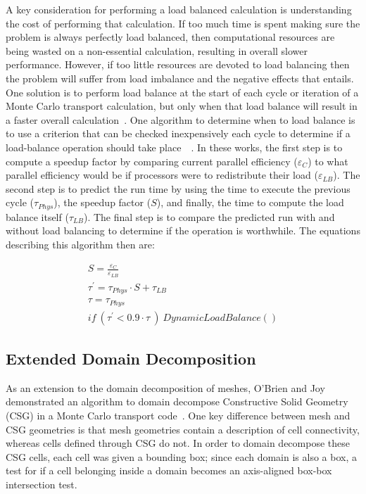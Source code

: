 %
A key consideration for performing a load balanced calculation is understanding the cost of performing that calculation.
%
If too much time is spent making sure the problem is always perfectly load balanced, then computational resources are being wasted on a non-essential calculation, resulting in overall slower performance.
%
However, if too little resources are devoted to load balancing then the problem will suffer from load imbalance and the negative effects that entails.
%
One solution is to perform load balance at the start of each cycle or iteration of a Monte Carlo transport calculation, but only when that load balance will result in a faster overall calculation~\cite{o2005dynamic}.
%
One algorithm to determine when to load balance is to use a
criterion that can be checked inexpensively each cycle to determine if a load-balance operation should take place~\cite{procassini2005load}~\cite{o2005dynamic}.
%
In these works, the first step is to compute a speedup factor by comparing current parallel efficiency ($ \varepsilon_C $) to what parallel efficiency would be if processors were to redistribute their load ($ \varepsilon_{LB} $).
%
The second step is to predict the run time by using the time to execute the previous cycle ($ \tau_{Phys} $), the speedup factor ($S$), and finally, the time to compute the load balance itself ($ \tau_{LB} $).
%
The final step is to compare the predicted run with and without load balancing to determine if the operation is worthwhile.
%
The equations describing this algorithm then are:

\begin{eqnarray}
S = \frac{\varepsilon_C}{\varepsilon_{LB}} \\
\tau^{'} = \tau_{Phys} \cdot S + \tau_{LB} \\
\tau = \tau_{Phys} \\
if\ (\tau^{'} < 0.9 \cdot \tau \ )\ DynamicLoadBalance()
\end{eqnarray}

\subsection*{Extended Domain Decomposition}

As an extension to the domain decomposition of meshes, O'Brien and Joy demonstrated an algorithm to domain decompose Constructive Solid Geometry (CSG) in a Monte Carlo transport code~\cite{o2009domain}.
%
One key difference between mesh and CSG geometries is that mesh geometries contain a description of cell connectivity, whereas cells defined through CSG do not.
%
In order to domain decompose these CSG cells, each cell was given a bounding box; since each domain is also a box, a test for if a cell belonging inside a domain becomes an axis-aligned box-box intersection test.
%

